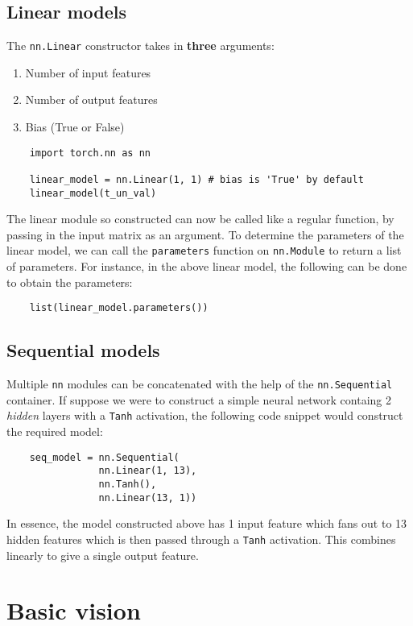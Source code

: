 \documentclass[11pt]{article}
\begin{document}
\subsection{Linear models}
\label{sec:org8d777b1}
The \texttt{nn.Linear} constructor takes in \textbf{three} arguments:
\begin{enumerate}
\item Number of input features
\item Number of output features
\item Bias (True or False)
\end{enumerate}
\begin{verbatim}
    import torch.nn as nn

    linear_model = nn.Linear(1, 1) # bias is 'True' by default
    linear_model(t_un_val)
\end{verbatim}
The linear module so constructed can now be called like a regular function, by passing in the input matrix as an argument. To determine the parameters of the linear model, we can call the \texttt{parameters} function on \texttt{nn.Module} to return a list of parameters. For instance, in the above linear model, the following can be done to obtain the parameters:
\begin{verbatim}
    list(linear_model.parameters())
\end{verbatim}

\subsection{Sequential models}
\label{sec:org6543621}
Multiple \texttt{nn} modules can be concatenated with the help of the \texttt{nn.Sequential} container. If suppose we were to construct a simple neural network containg 2 \emph{hidden} layers with a \texttt{Tanh} activation, the following code snippet would construct the required model:
\begin{verbatim}
    seq_model = nn.Sequential(
                nn.Linear(1, 13),
                nn.Tanh(),
                nn.Linear(13, 1))
\end{verbatim}
In essence, the model constructed above has 1 input feature which fans out to 13 hidden features which is then passed through a \texttt{Tanh} activation. This combines linearly to give a single output feature.

\section{Basic vision}
\label{sec:org2d3f218}
\end{document}
